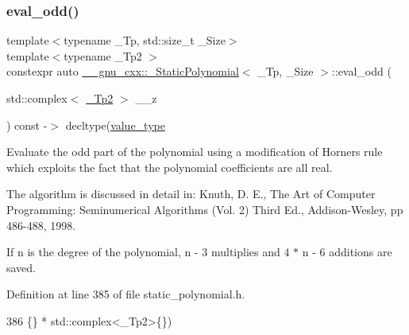\subsubsection{\texorpdfstring{eval\+\_\+odd()}{eval\_odd()}\hspace{0.1cm}{\footnotesize\ttfamily [2/2]}}
{\footnotesize\ttfamily template$<$typename \+\_\+\+Tp, std\+::size\+\_\+t \+\_\+\+Size$>$ \\
template$<$typename \+\_\+\+Tp2 $>$ \\
constexpr auto \hyperlink{class____gnu__cxx_1_1__StaticPolynomial}{\+\_\+\+\_\+gnu\+\_\+cxx\+::\+\_\+\+Static\+Polynomial}$<$ \+\_\+\+Tp, \+\_\+\+Size $>$\+::eval\+\_\+odd (\begin{DoxyParamCaption}\item[{std\+::complex$<$ \hyperlink{class____gnu__cxx_1_1__StaticPolynomial_a688f26b7c706701416fad299240aa856}{\+\_\+\+Tp2} $>$}]{\+\_\+\+\_\+z }\end{DoxyParamCaption}) const -\/$>$ decltype(\hyperlink{class____gnu__cxx_1_1__StaticPolynomial_aad5f3d6d5876b6926b30724aeac649d6}{value\+\_\+type}\hspace{0.3cm}{\ttfamily [inline]}}

Evaluate the odd part of the polynomial using a modification of Horner\textquotesingle{}s rule which exploits the fact that the polynomial coefficients are all real.

The algorithm is discussed in detail in\+: Knuth, D. E., The Art of Computer Programming\+: Seminumerical Algorithms (Vol. 2) Third Ed., Addison-\/\+Wesley, pp 486-\/488, 1998.

If n is the degree of the polynomial, n -\/ 3 multiplies and 4 $\ast$ n -\/ 6 additions are saved. 

Definition at line 385 of file static\+\_\+polynomial.\+h.


\begin{DoxyCode}
386                               \{\} * std::complex<\_Tp2>\{\})
\end{DoxyCode}
\mbox{\label{class____gnu__cxx_1_1__StaticPolynomial_a223bd4d9106732953bea7af8a2c116d1}} 
